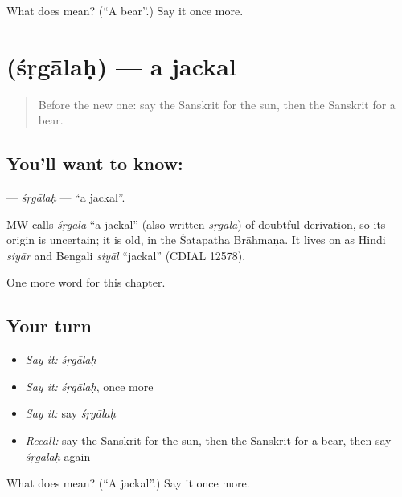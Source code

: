 \begin{tcolorbox}[breakable,colback=teal!4,colframe=teal!35!black,title={Before you move on}]
What does  mean? (\textquotedblleft{}A bear\textquotedblright{}.) Say it once more.
\end{tcolorbox}
\section[\texorpdfstring{\sk{शृगालः} (śṛgālaḥ)}{शृगालः (śṛgālaḥ)}]{ (śṛgālaḥ) — a jackal}

\label{lesson:SA-C112-srgalah}



\begin{quote}
Before the new one: say the Sanskrit for the sun, then the Sanskrit for a bear.
\end{quote}

\subsection*{You'll want to know: }
\textbf{} — \emph{śṛgālaḥ} — \textquotedblleft{}a jackal\textquotedblright{}.

\begin{cousinweb}
MW calls \emph{śṛgāla} \textquotedblleft{}a jackal\textquotedblright{} (also written \emph{sṛgāla}) of doubtful derivation, so its origin is uncertain; it is old, in the Śatapatha Brāhmaṇa. It lives on as Hindi \emph{siyār} and Bengali \emph{siyāl} \textquotedblleft{}jackal\textquotedblright{} (CDIAL 12578).
\end{cousinweb}

\begin{grammarlens}[title={What you've built}]
One more word for this chapter.
\end{grammarlens}

\subsection*{Your turn}
\begin{itemize}
\raggedright
  \item \emph{Say it:} \emph{śṛgālaḥ}
  \item \emph{Say it:} \emph{śṛgālaḥ}, once more
  \item \emph{Say it:} say \emph{śṛgālaḥ}
  \item \emph{Recall:} say the Sanskrit for the sun, then the Sanskrit for a bear, then say \emph{śṛgālaḥ} again
\end{itemize}

\begin{tcolorbox}[breakable,colback=teal!4,colframe=teal!35!black,title={Before you move on}]
What does  mean? (\textquotedblleft{}A jackal\textquotedblright{}.) Say it once more.
\end{tcolorbox}
